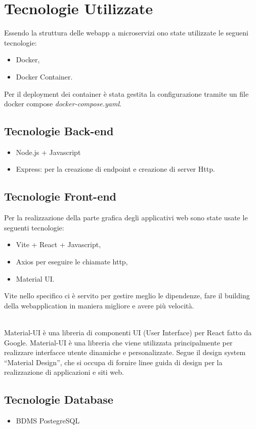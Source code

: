 \section{Tecnologie Utilizzate}
Essendo la struttura delle webapp a microservizi  ono state utilizzate le segueni tecnologie:
\begin{itemize}
    \item Docker,
    \item Docker Container.
\end{itemize}

Per il deployment dei container è stata gestita la configurazione tramite un file docker compose \textit{docker-compose.yaml}.
\subsection{Tecnologie Back-end}
\begin{itemize}
    \item Node.js + Javascript
    \item Express: per la creazione di endpoint e creazione di server Http. 
\end{itemize}

\subsection{Tecnologie Front-end}
Per la realizzazione della parte grafica degli applicativi web sono state usate le seguenti tecnologie:
\begin{itemize}
    \item Vite + React + Javascript,
    \item Axios per eseguire le chiamate http,
    \item Material UI.
\end{itemize}

Vite nello specifico ci è servito per gestire meglio le dipendenze, fare il building della webapplication in maniera migliore e avere più velocità. \\\

Material-UI è una libreria di componenti UI (User Interface) per React fatto da Google. Material-UI è una libreria che viene utilizzata principalmente per realizzare interfacce utente dinamiche e personalizzate.
Segue il design system “Material Design”, che si occupa di fornire linee guida di design per la realizzazione di applicazioni e siti web.\\

\subsection{Tecnologie Database}
\begin{itemize}
    \item BDMS PostegreSQL
\end{itemize}


